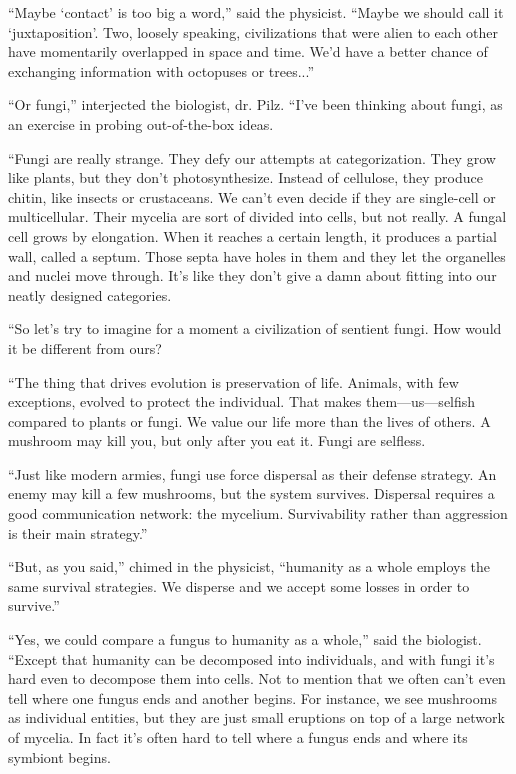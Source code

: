 \documentclass[12pt]{book}
\begin{document}
``Maybe `contact' is too big a word,'' said the physicist. ``Maybe we should call it `juxtaposition'. Two, loosely speaking, civilizations that were alien to each other have momentarily overlapped in space and time. We'd have a better chance of exchanging information with octopuses or trees...''

``Or fungi,'' interjected the biologist, dr. Pilz. ``I've been thinking about fungi, as an exercise in probing out-of-the-box ideas.

``Fungi are really strange. They defy our attempts at categorization. They grow like plants, but they don't photosynthesize. Instead of cellulose, they produce chitin, like insects or crustaceans. We can't even decide if they are single-cell or multicellular. Their mycelia are sort of divided into cells, but not really. A fungal cell grows by elongation. When it reaches a certain length, it produces a partial wall, called a septum. Those septa have holes in them and they let the organelles and nuclei move through. It's like they don't give a damn about fitting into our neatly designed categories. 

``So let's try to imagine for a moment a civilization of sentient fungi. How would it be different from ours?

``The thing that drives evolution is preservation of life. Animals, with few exceptions, evolved to protect the individual. That makes them---us---selfish compared to plants or fungi. We value our life more than the lives of others. A mushroom may kill you, but only after you eat it. Fungi are selfless. 

``Just like modern armies, fungi use force dispersal as their defense strategy. An enemy may kill a few mushrooms, but the system survives. Dispersal requires a good communication network: the mycelium. Survivability rather than aggression is their main strategy.''

``But, as you said,'' chimed in the physicist, ``humanity as a whole employs the same survival strategies. We disperse and we accept some losses in order to survive.''

``Yes, we could compare a fungus to humanity as a whole,'' said the biologist. ``Except that humanity can be decomposed into individuals, and with fungi it's hard even to decompose them into cells. Not to mention that we often can't even tell where one fungus ends and another begins. For instance, we see mushrooms as individual entities, but they are just small eruptions on top of a large network of mycelia. In fact it's often hard to tell where a fungus ends and where its symbiont begins.
\end{document}
